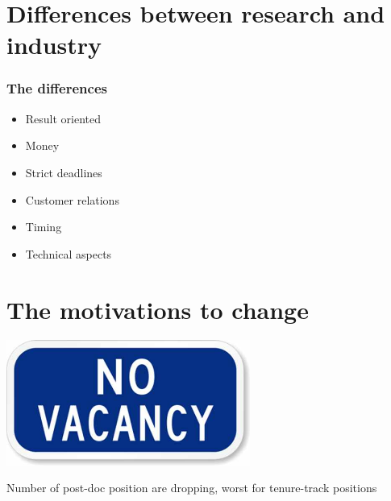 \documentclass[]{beamer}
\begin{document}
\section[Differences]{Differences between research and industry}
\begin{frame}
\frametitle{The differences}
\begin{itemize}
\item Result oriented
\item Money
\item Strict deadlines
\item Customer relations
\item Timing
\item Technical aspects
\end{itemize}
\end{frame}

\section[Motivations]{The motivations to change}
%

\begin{frame}
\centering
\includegraphics[width=0.6\textwidth]{No-Vacancy-Sign}

Number of post-doc position are dropping, worst for tenure-track positions
\end{frame}
\end{document}

